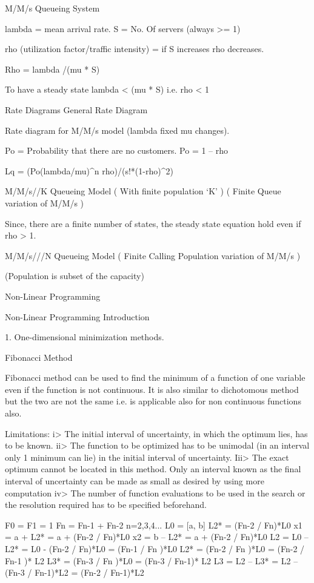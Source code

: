 M/M/s Queueing System

lambda = mean arrival rate.
S = No. Of servers (always >= 1)

rho (utilization factor/traffic intensity)  = if S increases rho decreases.

Rho = lambda /(mu * S)

To have a steady state
lambda < (mu * S)  i.e.  rho < 1

Rate Diagrams
General Rate Diagram

Rate diagram for M/M/s model (lambda fixed mu changes).


Po = Probability that there are no customers.
Po = 1 – rho

Lq = (Po(lambda/mu)^n rho)/(s!*(1-rho)^2)
 

		M/M/s//K Queueing Model ( With finite population ‘K’ )
			( Finite Queue variation of M/M/s )



Since, there are a finite number of states, the steady state equation hold even if rho > 1.

			M/M/s///N Queueing Model
				( Finite Calling Population variation of M/M/s )

			(Population is subset of the capacity)








						Non-Linear Programming

Non-Linear Programming Introduction

1. One-dimensional minimization methods.

Fibonacci Method

Fibonacci method can be used to find the minimum of a function of one variable even if the function is not continuous.
It is also similar to dichotomous method but the two are not the same i.e. is applicable also for  non continuous functions also.

Limitations:
i> The initial interval of uncertainty, in which the optimum lies, has to be known.
ii> The function to be optimized has to be unimodal (in an interval only 1 minimum can lie) in the initial interval of uncertainty.
Iii> The exact optimum cannot be located in this method. Only an interval known as the final interval of uncertainty can be made as small as desired by using more computation  
iv> The number of function evaluations to be used in the search or the resolution required has to be specified beforehand.

F0 = F1 = 1
Fn = Fn-1 + Fn-2  n=2,3,4...
L0 = [a, b]
L2* = (Fn-2 / Fn)*L0
x1 = a + L2* = a + (Fn-2 / Fn)*L0
x2 = b – L2*      = a + (Fn-2 / Fn)*L0
L2 = L0 – L2* = L0 - (Fn-2 / Fn)*L0 = (Fn-1 / Fn )*L0
L2* = (Fn-2 / Fn )*L0 = (Fn-2 / Fn-1 )* L2
L3*  = (Fn-3 / Fn )*L0 = (Fn-3 / Fn-1)* L2
L3 = L2 – L3* = L2 – (Fn-3 / Fn-1)*L2 = (Fn-2 / Fn-1)*L2

